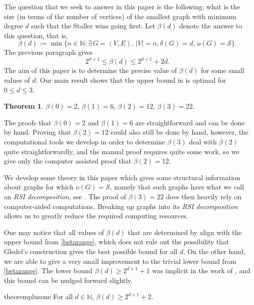 \documentclass[a4paper,11pt,oneside]{scrartcl}
\theoremstyle{definition}
\newtheorem{theorem}[definition]{Theorem}
\theoremstyle{remark}
\begin{document}
The question that we seek to answer in this paper is the following; what is the size (in terms of the number of vertices) of the smallest graph with minimum degree $d$ such that the Staller wins going first. Let $\beta(d)$ denote the answer to this question, that is,
\[
    \beta(d):= \min \{ n \in \mathbb N:  \exists \,  G=(V,E), \,|V|=n, \delta(G)=d,\, o(G)= \mathcal S \}.
\]
The previous paragraph gives
\begin{equation} \label{betarange}
    2^{d+1} \leq \beta(d) \leq 2^{d+1}+2d.  
\end{equation}The aim of this paper is to determine the precise value of $\beta(d)$ for some small values of $d$. Our main result shows that the upper bound in  is optimal for $0 \leq d \leq 3$.

\begin{theorem} \label{thm:beta} 
    $\beta(0)=2$, $\beta(1)=6$, $\beta(2)=12$, $\beta(3)=22$.
\end{theorem}


The proofs that $\beta(0)=2$ and $\beta(1)=6$ are straightforward and can be done by hand. Proving that $\beta(2)=12$ could also still be done by hand, however, the computational tools we develop in order to determine $\beta(3)$ deal with $\beta(2)$ quite straightforwardly, and the manual proof requires quite some work, so we give only the computer assisted proof that $\beta(2)=12$.

We develop some theory in this paper which gives some structural information about graphs for which $o(G)= \mathcal S$, namely that such graphs have what we call an \textit{RSI decomposition}, see . The proof of $\beta(3)=22$ does then heavily rely on computer-aided computations. Breaking up graphs into its \textit{RSI decomposition} allows us to greatly reduce the required computing resources.


One may notice that all values of $\beta(d)$ that are determined by  align with the upper bound from \eqref{betarange}, which does not rule out the possibility that Gledel's construction gives the best possible bound for all $d$. On the other hand, we are able to give a very small improvement to the trivial lower bound from \eqref{betarange}. The lower bound $\beta(d) \geq 2^{d+1}+1$ was implicit in the work of \cite{BDGLP}, and this bound can be nudged forward slightly.

\begin{restatable}{theorem}{plusone}\label{thm:plusone} 
    For all $d \in \mathbb N$,
    $\beta(d) \geq 2^{d+1}+2$.
\end{restatable}
\end{document}
